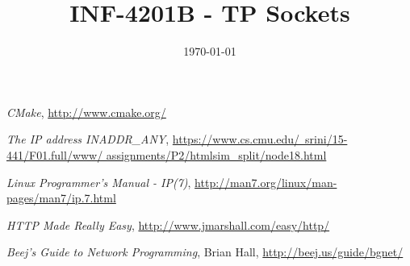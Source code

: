\documentclass[a4paper, frenchb, 11pt]{article}
\title{
	\textbf{INF-4201B - TP Sockets}\\
}
\date{\today}
\begin{document}
\maketitle
\newpage

\tableofcontents
\newpage


\newpage


\newpage


\newpage


\newpage


\newpage


\newpage

\renewcommand\refname{Ressources utilisées}
\begin{thebibliography}{5}
 \emph{CMake}, \href{http://www.cmake.org/}{http://www.cmake.org/}

 \emph{The IP address INADDR\_ANY}, \href{https://www.cs.cmu.edu/~srini/15-441/F01.full/www/assignments/P2/htmlsim_split/node18.html}{https://www.cs.cmu.edu/~srini/15-441/F01.full/www/ assignments/P2/htmlsim\_split/node18.html}

 \emph{Linux Programmer's Manual - IP(7)}, \href{http://man7.org/linux/man-pages/man7/ip.7.html}{http://man7.org/linux/man-pages/man7/ip.7.html}

 \emph{HTTP Made Really Easy}, \href{http://www.jmarshall.com/easy/http/}{http://www.jmarshall.com/easy/http/}

 \emph{Beej's Guide to Network Programming}, Brian Hall, \href{http://beej.us/guide/bgnet/}{http://beej.us/guide/bgnet/}
\end{thebibliography}
\end{document}
